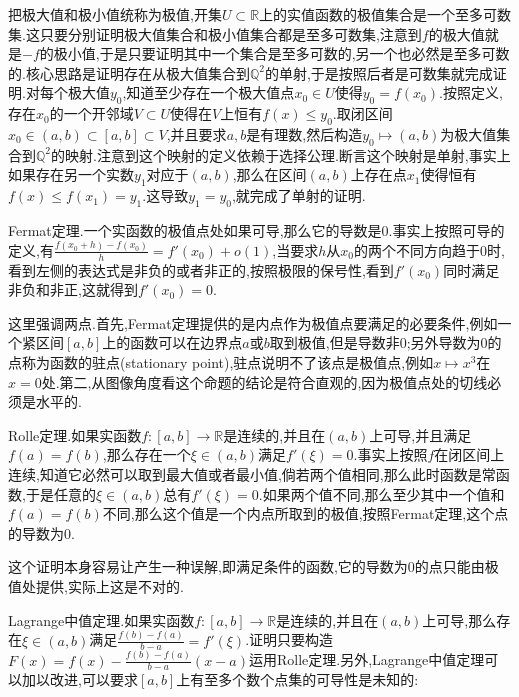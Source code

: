 把极大值和极小值统称为极值,开集$U\subset\mathbb{R}$上的实值函数的极值集合是一个至多可数集.这只要分别证明极大值集合和极小值集合都是至多可数集,注意到$f$的极大值就是$-f$的极小值,于是只要证明其中一个集合是至多可数的,另一个也必然是至多可数的.核心思路是证明存在从极大值集合到$\mathbb{Q}^2$的单射,于是按照后者是可数集就完成证明.对每个极大值$y_0$,知道至少存在一个极大值点$x_0\in U$使得$y_0=f(x_0)$.按照定义,存在$x_0$的一个开邻域$V\subset U$使得在$V$上恒有$f(x)\le y_0$.取闭区间$x_0\in(a,b)\subset[a,b]\subset V$,并且要求$a,b$是有理数,然后构造$y_0\mapsto (a,b)$为极大值集合到$\mathbb{Q}^2$的映射.注意到这个映射的定义依赖于选择公理.断言这个映射是单射,事实上如果存在另一个实数$y_1$对应于$(a,b)$,那么在区间$(a,b)$上存在点$x_1$使得恒有$f(x)\le f(x_1)=y_1$.这导致$y_1=y_0$,就完成了单射的证明.

Fermat定理.一个实函数的极值点处如果可导,那么它的导数是0.事实上按照可导的定义,有$\frac{f(x_0+h)-f(x_0)}{h}=f'(x_0)+o(1)$,当要求$h$从$x_0$的两个不同方向趋于0时,看到左侧的表达式是非负的或者非正的,按照极限的保号性,看到$f'(x_0)$同时满足非负和非正,这就得到$f'(x_0)=0$.

这里强调两点.首先,Fermat定理提供的是内点作为极值点要满足的必要条件,例如一个紧区间$[a,b]$上的函数可以在边界点$a$或$b$取到极值,但是导数非0;另外导数为0的点称为函数的驻点(stationary point),驻点说明不了该点是极值点,例如$x\mapsto x^3$在$x=0$处.第二,从图像角度看这个命题的结论是符合直观的,因为极值点处的切线必须是水平的.

Rolle定理.如果实函数$f:[a,b]\to\mathbb{R}$是连续的,并且在$(a,b)$上可导,并且满足$f(a)=f(b)$,那么存在一个$\xi\in(a,b)$满足$f'(\xi)=0$.事实上按照$f$在闭区间上连续,知道它必然可以取到最大值或者最小值,倘若两个值相同,那么此时函数是常函数,于是任意的$\xi\in(a,b)$总有$f'(\xi)=0$.如果两个值不同,那么至少其中一个值和$f(a)=f(b)$不同,那么这个值是一个内点所取到的极值,按照Fermat定理,这个点的导数为0.

这个证明本身容易让产生一种误解,即满足条件的函数,它的导数为0的点只能由极值处提供,实际上这是不对的.

Lagrange中值定理.如果实函数$f:[a,b]\to\mathbb{R}$是连续的,并且在$(a,b)$上可导,那么存在$\xi\in(a,b)$满足$\frac{f(b)-f(a)}{b-a}=f'(\xi)$.证明只要构造$F(x)=f(x)-\frac{f(b)-f(a)}{b-a}(x-a)$运用Rolle定理.另外,Lagrange中值定理可以加以改进,可以要求$[a,b]$上有至多个数个点集的可导性是未知的:

